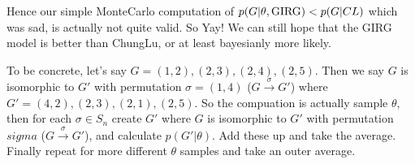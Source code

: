 Hence our simple MonteCarlo computation of $p(G | \theta, \operatorname{GIRG}) < p(G | CL)$ which was sad, is actually not quite valid. So Yay! We can still hope that the GIRG model is better than ChungLu, or at least bayesianly more likely.

To be concrete, let's say $G=(1,2), (2, 3), (2, 4), (2, 5)$. Then we say $G$ is isomorphic to $G'$ with permutation $\sigma= (1,4)$ ($G \stackrel{\sigma}{\to} G'$) where $G' = (4, 2), (2, 3), (2, 1), (2, 5)$. So the compuation is actually sample $\theta$,  then for each $\sigma \in S_n$ create $G'$ where $G$ is isomorphic to $G'$ with permutation $sigma$ ($G \stackrel{\sigma}{\to} G'$), and calculate $p(G' | \theta)$. Add these up and take the average.
Finally repeat for more different $\theta$ samples and take an outer average.


  
  

